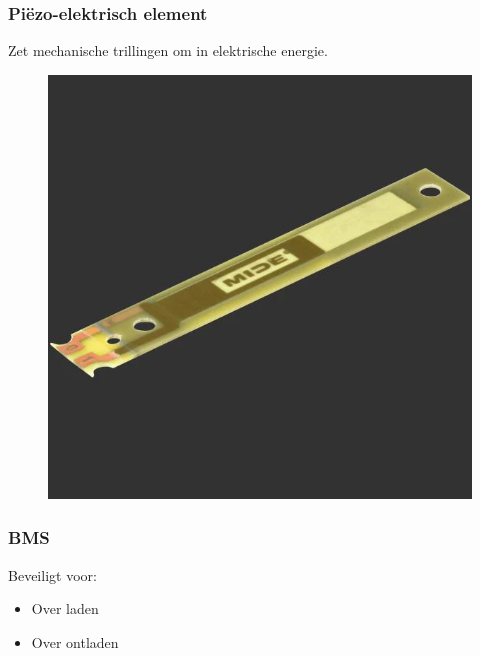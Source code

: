     \begin{frame}
        \frametitle{Piëzo-elektrisch element}
    
        Zet mechanische trillingen om in elektrische energie.
        \begin{figure}[h]
            \raggedright
            \includegraphics[scale=0.2]{img/peizo.png}
        \end{figure}
        


    \end{frame}
    \begin{frame}
        \frametitle{BMS}
    
        Beveiligt voor:
        \begin{itemize}
            \item Over laden
            \item Over ontladen

            
        \end{itemize}
    
    \end{frame}
    
        
    
